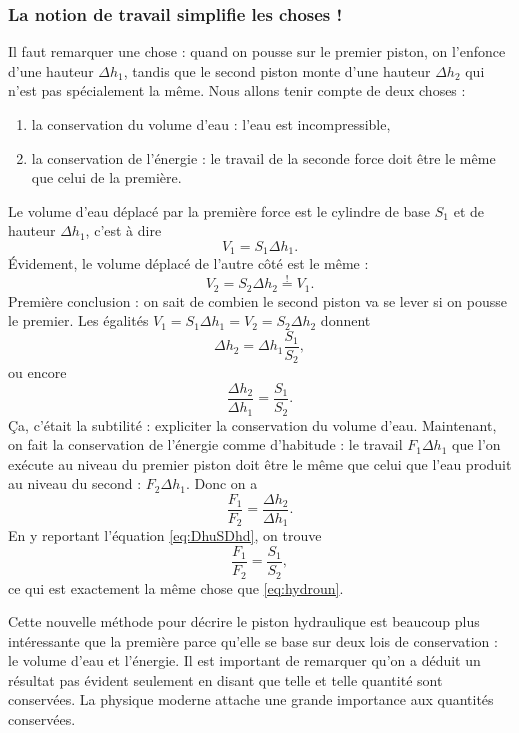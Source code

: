\subsubsection{La notion de travail simplifie les choses !}

Il faut remarquer une chose : quand on pousse sur le premier piston, on l'enfonce d'une hauteur $\Delta h_1$, tandis que le second piston monte d'une hauteur $\Delta h_2$ qui n'est pas spécialement la même. Nous allons tenir compte de deux choses :

\begin{enumerate}
\item la conservation du volume d'eau : l'eau est incompressible,
\item la conservation de l'énergie : le travail de la seconde force doit être le même que celui de la première. 
\end{enumerate}
Le volume d'eau déplacé par la première force est le cylindre de base $S_1$ et de hauteur $\Delta h_1$, c'est à dire
\[
   V_1=S_1\Delta h_1.
\]
Évidement, le volume déplacé de l'autre côté est le même :
\[
   V_2=S_2\Delta h_2\stackrel{!}{=}V_1.
\] 
Première conclusion : on sait de combien le second piston va se lever si on pousse le premier. Les égalités $V_1=S_1\Delta h_1=V_2=S_2\Delta h_2$ donnent 
\[
\Delta h_2=\Delta h_1\frac{S_1}{S_2},
\]
ou encore
\begin{equation}  \label{eq:DhuSDhd}
\frac{\Delta h_2}{\Delta h_1}=\frac{S_1}{S_2}.
\end{equation}
Ça, c'était la subtilité : expliciter la conservation du volume d'eau. Maintenant, on fait la conservation de l'énergie comme d'habitude : le travail $F_1\Delta h_1$ que l'on exécute au niveau du premier piston doit être le même que celui que l'eau produit au niveau du second : $F_2\Delta h_1$. Donc on a 
\[
    \frac{F_1}{F_2}=\frac{\Delta h_2}{\Delta h_1}.
\]
En y reportant l'équation \eqref{eq:DhuSDhd}, on trouve
\begin{equation}
\frac{F_1}{F_2}=\frac{S_1}{S_2},
\end{equation}
ce qui est exactement la même chose que \eqref{eq:hydroun}. 

Cette nouvelle méthode pour décrire le piston hydraulique est beaucoup plus intéressante que la première parce qu'elle se base sur deux lois de conservation : le volume d'eau et l'énergie. Il est important de remarquer qu'on a déduit un résultat pas évident seulement en disant que telle et telle quantité sont conservées. La physique moderne attache une grande importance aux quantités conservées.





